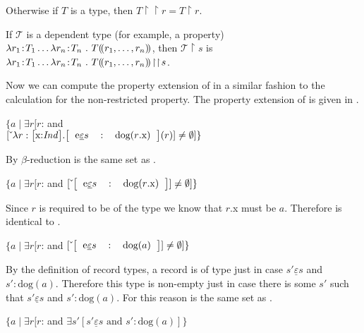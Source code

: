\begin{shaded}
Otherwise if $T$ is a type, then
$T\!\restriction\restriction\!r=T\!\restriction\!r$.

If $\mathcal{T}$ is a dependent type (for example, a property)
$\lambda r_1\!:\!T_1\ldots\lambda r_n\!:\!T_n\ .\
T(\!(r_1,\ldots,r_n)\!)$, then $\mathcal{T}\!\restriction\!s$ is $\lambda r_1\!:\!T_1\ldots\lambda r_n\!:\!T_n\ .\
T\dep{r_1,\ldots,r_n}\!\restriction\restriction\!s$.

\end{shaded}


Now we can compute the property extension of
 in a similar fashion to the calculation for the
non-restricted property.   
The property extension of \preveg{b} is given in \nexteg{}.\label{pg:set-reduction-gq}
\begin{ex} 
$\{a\mid\exists
  r[r$: and \\
\hspace*{2em}$\down{\lambda
  r:\text{\smallrecord{\smalltfield{x}{\textit{Ind}}}}
  . \text{\record{\rfield{e}{$s$}{dog($r$.x)}}}(r)} \not=\emptyset]\}$ 
\end{ex} 
By $\beta$-reduction \preveg{} is the same set as \nexteg{}.
\begin{ex} 
$\{a\mid\exists
  r[r$: and 
$\down{\text{\record{\rfield{e}{$s$}{dog($r$.x)}}}} \not=\emptyset]\}$  
\end{ex} 
Since $r$ is required to be of the type
 we know that $r$.x
must be $a$.  Therefore \preveg{} is identical to \nexteg{}.
\begin{ex} 
$\{a\mid\exists
  r[r$: and 
$\down{\text{\record{\rfield{e}{$s$}{dog($a$)}}}} \not=\emptyset]\}$ 
\end{ex} 
By the definition of record types, a record
 is of type
\smallrecord{\smallrfield{e}{$s$}{dog($a$)}} just in case $s'\underline{\varepsilon}s$ and
$s':\text{dog}(a)$.
Therefore this type is non-empty just in case there is some $s'$ such
that $s'\underline{\varepsilon}s$ and $s':\text{dog}(a)$.
For this reason \preveg{} is the same set as \nexteg{}.
\begin{ex} 
$\{a\mid\exists
  r[r$: and 
$\exists s'[s'\underline{\varepsilon}s \text{ and } s':\text{dog}(a)]\}$ 
\end{ex}
